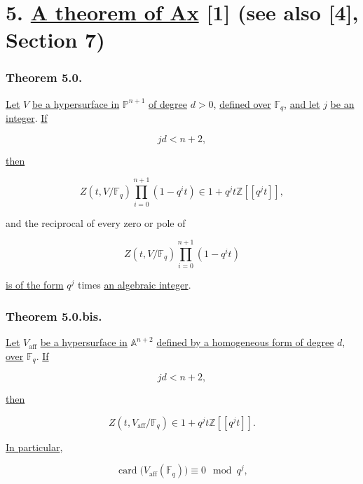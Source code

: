 \section*{5. \underline{A theorem of Ax} [1] (see also [4], Section 7)}

\subsubsection*{Theorem 5.0.}
\underline{Let} $V$ \underline{be a hypersurface in} $\mathbb P^{n+1}$ \underline{of degree} $d>0$, \underline{defined
over} $\mathbb F_q$, \underline{and let} $j$ \underline{be an integer}.  \underline{If}

\begin{equation}\tag{5.0.1}
jd<n+2,
\end{equation}

\underline{then}

\begin{equation}\tag{5.0.2}
Z(t,V/\mathbb F_q)\prod_{i=0}^{n+1}(1-q^it)
\in1+q^jt\mathbb Z[[q^jt]],
\end{equation}

and the reciprocal of every zero or pole of

\begin{equation}\tag{5.0.3}
Z(t,V/\mathbb F_q)\prod_{i=0}^{n+1}(1-q^it)
\end{equation}

\noindent
\underline{is of the form} $q^j$ times \underline{an algebraic integer}.

\subsubsection*{Theorem 5.0.bis.}
\underline{Let} $V_{\mathrm{aff}}$ \underline{be a hypersurface in} $\mathbb A^{n+2}$ \underline{defined by a
homogeneous form of degree} $d$, \underline{over} $\mathbb F_q$.  \underline{If}

\begin{equation}\tag{5.0.4}
jd<n+2,
\end{equation}

\underline{then}

\begin{equation}\tag{5.0.5}
Z(t,V_{\mathrm{aff}}/\mathbb F_q)
\in1+q^jt\mathbb Z[[q^jt]].
\end{equation}

\underline{In particular},

\begin{equation}\tag{5.0.6}
\operatorname{card}\bigl(V_{\mathrm{aff}}(\mathbb F_q)\bigr)
\equiv0\mod{q^j},
\end{equation}


